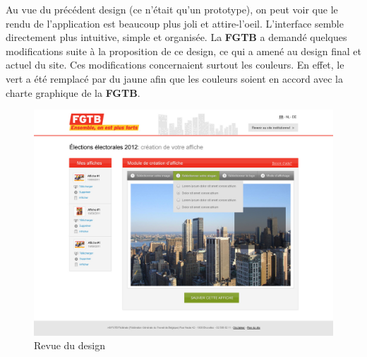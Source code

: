 \documentclass{article}
\begin{document}
\begin{sffamily}
Au vue du précédent design (ce n'était qu'un prototype), on peut voir que le rendu de l'application est beaucoup plus joli et attire-l'oeil. 
L'interface semble directement plus intuitive, simple et organisée. La \textbf{FGTB} a demandé quelques modifications suite à la proposition de ce 
design, ce qui a amené au design final et actuel du site. Ces modifications concernaient surtout les couleurs. En effet, le vert a été remplacé par 
du jaune afin que les couleurs soient en accord avec la charte graphique de la \textbf{FGTB}. \\

\begin{figure}[h!]
	 \begin{center}
	   \includegraphics[width=\textwidth]{review.png} 
	   \caption{Revue du design}
	\end{center}
\end{figure}

\end{sffamily}
\end{document}

